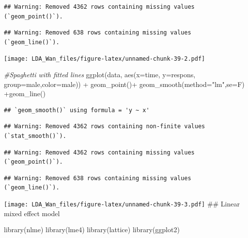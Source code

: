 \documentclass[
]{article}
\newenvironment{Shaded}{\begin{snugshade}}{\end{snugshade}}
\newcommand{\AttributeTok}[1]{\textcolor[rgb]{0.77,0.63,0.00}{#1}}
\newcommand{\CommentTok}[1]{\textcolor[rgb]{0.56,0.35,0.01}{\textit{#1}}}
\newcommand{\FunctionTok}[1]{\textcolor[rgb]{0.00,0.00,0.00}{#1}}
\newcommand{\NormalTok}[1]{#1}
\newcommand{\SpecialCharTok}[1]{\textcolor[rgb]{0.00,0.00,0.00}{#1}}
\newcommand{\StringTok}[1]{\textcolor[rgb]{0.31,0.60,0.02}{#1}}
\begin{document}
\begin{verbatim}
## Warning: Removed 4362 rows containing missing values (`geom_point()`).
\end{verbatim}

\begin{verbatim}
## Warning: Removed 638 rows containing missing values (`geom_line()`).
\end{verbatim}

\texttt{[image: LDA\_Wan\_files/figure-latex/unnamed-chunk-39-2.pdf]}

\begin{Shaded}
\begin{Highlighting}[]
\CommentTok{\#Spaghetti with fitted lines}
\FunctionTok{ggplot}\NormalTok{(data, }\FunctionTok{aes}\NormalTok{(}\AttributeTok{x=}\NormalTok{time, }\AttributeTok{y=}\NormalTok{respons, }\AttributeTok{group=}\NormalTok{male,}\AttributeTok{color=}\NormalTok{male)) }\SpecialCharTok{+} \FunctionTok{geom\_point}\NormalTok{()}\SpecialCharTok{+} \FunctionTok{geom\_smooth}\NormalTok{(}\AttributeTok{method=}\StringTok{"lm"}\NormalTok{,}\AttributeTok{se=}\NormalTok{F) }\SpecialCharTok{+}\FunctionTok{geom\_line}\NormalTok{()}
\end{Highlighting}
\end{Shaded}

\begin{verbatim}
## `geom_smooth()` using formula = 'y ~ x'
\end{verbatim}

\begin{verbatim}
## Warning: Removed 4362 rows containing non-finite values (`stat_smooth()`).
\end{verbatim}

\begin{verbatim}
## Warning: Removed 4362 rows containing missing values (`geom_point()`).
\end{verbatim}

\begin{verbatim}
## Warning: Removed 638 rows containing missing values (`geom_line()`).
\end{verbatim}

\texttt{[image: LDA\_Wan\_files/figure-latex/unnamed-chunk-39-3.pdf]}
\newpage \#\# Linear mixed effect model

\begin{Shaded}
\begin{Highlighting}[]
\FunctionTok{library}\NormalTok{(nlme)}
\FunctionTok{library}\NormalTok{(lme4)}
\FunctionTok{library}\NormalTok{(lattice)}
\FunctionTok{library}\NormalTok{(ggplot2)}
\end{Highlighting}
\end{Shaded}
\end{document}
